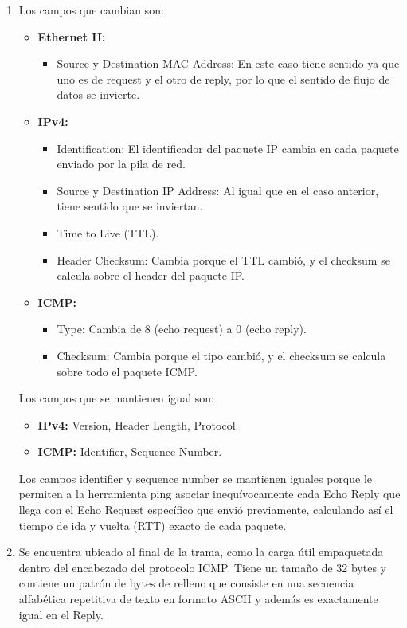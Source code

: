 \documentclass[11pt,a4paper]{article}
\begin{document}
\begin{enumerate}[label=\alph*)]
\item
    Los campos que cambian son:
    \begin{itemize}
        \item \textbf{Ethernet II:}
        \begin{itemize}
            \item Source y Destination MAC Address: En este caso tiene sentido ya que uno es de request y el otro de reply, por lo que el sentido de flujo de datos se invierte.
        \end{itemize}
        \item \textbf{IPv4:}
        \begin{itemize}
            \item Identification: El identificador del paquete IP cambia en cada paquete enviado por la pila de red.
            \item Source y Destination IP Address: Al igual que en el caso anterior, tiene sentido que se inviertan.
            \item Time to Live (TTL).
            \item Header Checksum: Cambia porque el TTL cambió, y el checksum se calcula sobre el header del paquete IP.
        \end{itemize}
        \item \textbf{ICMP:}
        \begin{itemize}
            \item Type: Cambia de 8 (echo request) a 0 (echo reply).
            \item Checksum: Cambia porque el tipo cambió, y el checksum se calcula sobre todo el paquete ICMP.
        \end{itemize}
    \end{itemize}

    Los campos que se mantienen igual son:
    \begin{itemize}
        \item \textbf{IPv4:} Version, Header Length, Protocol.
        \item \textbf{ICMP:} Identifier, Sequence Number.
    \end{itemize}

    Los campos identifier y sequence number se mantienen iguales porque le permiten a la herramienta ping asociar inequívocamente cada Echo Reply que llega con el Echo Request específico que envió previamente, calculando así el tiempo de ida y vuelta (RTT) exacto de cada paquete.

\item
    Se encuentra ubicado al final de la trama, como la carga útil empaquetada dentro del encabezado del protocolo ICMP. Tiene un tamaño de 32 bytes y contiene un patrón de bytes de relleno que consiste en una secuencia alfabética repetitiva de texto en formato ASCII y además es exactamente igual en el Reply.


\end{enumerate}
\end{document}
